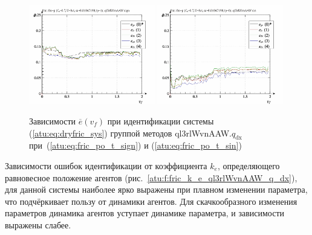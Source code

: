 \begin{figure}[htb!]
  \centerline{
    \includegraphics[width=0.49\textwidth]{p/cha/fric/ql3rlWvnAAW/fric_id-p_v_f_sign.png}
    \hfill
    \includegraphics[width=0.49\textwidth]{p/cha/fric/ql3rlWvnAAW/fric_id-p_v_f_sin.png}
  }
  \caption{Зависимости $\overline{e}(v_f)$ при идентификации системы (\ref{atu:eq:dryfric_sys}) группой методов ql3rlWvnAAW.$q_\mathrm{dx}$
   при~(\ref{atu:eq:fric_po_t_sign}) и (\ref{atu:eq:fric_po_t_sin})}
  \label{atu:f:fric_v_f_ql3rlWvnAAW_q_dx}
\end{figure}

Зависимости ошибок идентификации от коэффициента $k_e$,
определяющего равновесное положение агентов
(рис.~\ref{atu:f:fric_k_e_ql3rlWvnAAW_q_dx}),
для данной системы наиболее ярко выражены
при плавном изменении параметра,
что подчёркивает пользу от динамики агентов.
Для скачкообразного изменения параметров динамика
агентов уступает динамике параметра,
и зависимости выражены слабее.

